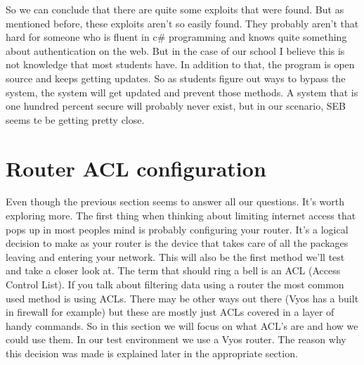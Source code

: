 So we can conclude that there are quite some exploits that were found. But as mentioned before, these exploits aren't so easily found. They probably aren't that hard for someone who is fluent in c\# programming and knows quite something about authentication on the web. But in the case of our school I believe this is not knowledge that most students have. In addition to that, the program is open source and keeps getting updates. So as students figure out ways to bypass the system, the system will get updated and prevent those methods.
A system that is one hundred percent secure will probably never exist, but in our scenario, SEB seems te be getting pretty close.

\section{Router ACL configuration}
Even though the previous section seems to answer all our questions. It's worth exploring more. The first thing when thinking about limiting internet access that pops up in most peoples mind is probably configuring your router.  It's a logical decision to make as your router is the device that takes care of all the packages leaving and entering your network. This will also be the first method we'll test and take a closer look at. The term that should ring a bell is an ACL (Access Control List). If you talk about filtering data using a router the most common used method is using ACLs. There may be other ways out there (Vyos has a built in firewall for example) but these are mostly just ACLs covered in a layer of handy commands. So in this section we will focus on what ACL's are and how we could use them.
In our test environment we use a Vyos router. The reason why this decision was made is explained later in the appropriate section.
